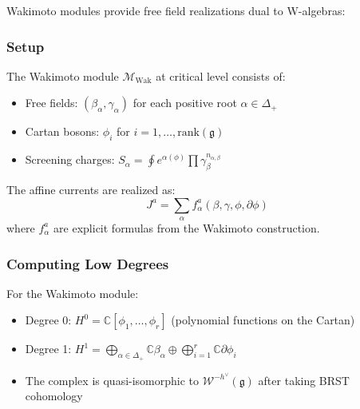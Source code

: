 Wakimoto modules provide free field realizations dual to W-algebras:
 
\subsubsection{Setup}
 
\begin{definition}
The Wakimoto module $\mathcal{M}_{\text{Wak}}$ at critical level consists of:
\begin{itemize}
\item Free fields: $(\beta_\alpha, \gamma_\alpha)$ for each positive root $\alpha \in \Delta_+$
\item Cartan bosons: $\phi_i$ for $i = 1, \ldots, \text{rank}(\mathfrak{g})$
\item Screening charges: $S_\alpha = \oint e^{\alpha(\phi)} \prod \gamma_\beta^{n_{\alpha,\beta}}$
\end{itemize}
The affine currents are realized as:
\[
J^a = \sum_{\alpha} f^a_\alpha(\beta, \gamma, \phi, \partial\phi)
\]
where $f^a_\alpha$ are explicit formulas from the Wakimoto construction.
\end{definition}
 
\subsubsection{Computing Low Degrees}
 
\begin{theorem}
For the Wakimoto module:
\begin{itemize}
\item Degree 0: $H^0 = \mathbb{C}[\phi_1, \ldots, \phi_r]$ (polynomial functions on the Cartan)
\item Degree 1: $H^1 = \bigoplus_{\alpha \in \Delta_+} \mathbb{C}\beta_\alpha \oplus \bigoplus_{i=1}^r \mathbb{C}\partial\phi_i$
\item The complex is quasi-isomorphic to $\mathcal{W}^{-h^\vee}(\mathfrak{g})$ after taking BRST cohomology
\end{itemize}
\end{theorem}
 
